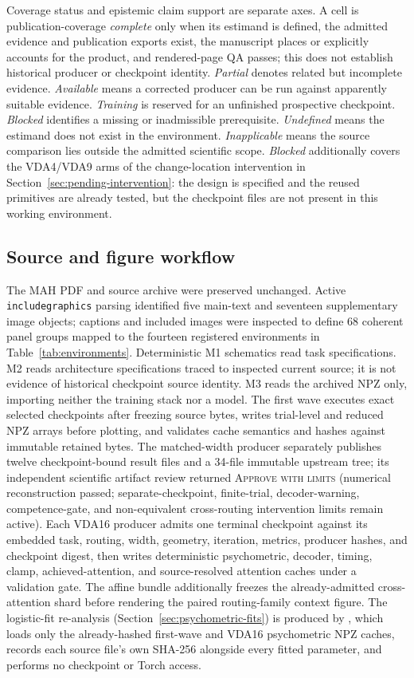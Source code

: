 \documentclass[11pt,a4paper]{article}
\begin{document}
Coverage status and epistemic claim support are separate axes. A cell is publication-coverage \emph{complete} only when its estimand is defined, the admitted evidence and publication exports exist, the manuscript places or explicitly accounts for the product, and rendered-page QA passes; this does not establish historical producer or checkpoint identity. \emph{Partial} denotes related but incomplete evidence. \emph{Available} means a corrected producer can be run against apparently suitable evidence. \emph{Training} is reserved for an unfinished prospective checkpoint. \emph{Blocked} identifies a missing or inadmissible prerequisite. \emph{Undefined} means the estimand does not exist in the environment. \emph{Inapplicable} means the source comparison lies outside the admitted scientific scope. \emph{Blocked} additionally covers the VDA4/VDA9 arms of the change-location intervention in Section~\ref{sec:pending-intervention}: the design is specified and the reused primitives are already tested, but the checkpoint files are not present in this working environment.

\subsection{Source and figure workflow}\label{sec:source-workflow}
The MAH PDF and source archive were preserved unchanged. Active \verb|includegraphics| parsing identified five main-text and seventeen supplementary image objects; captions and included images were inspected to define 68 coherent panel groups mapped to the fourteen registered environments in Table~\ref{tab:environments}. Deterministic M1 schematics read task specifications. M2 reads architecture specifications traced to inspected current source; it is not evidence of historical checkpoint source identity. M3 reads the archived NPZ only, importing neither the training stack nor a model. The first wave executes exact selected checkpoints after freezing source bytes, writes trial-level and reduced NPZ arrays before plotting, and validates cache semantics and hashes against immutable retained bytes. The matched-width producer separately publishes twelve checkpoint-bound result files and a 34-file immutable upstream tree; its independent scientific artifact review returned \textsc{Approve with limits} (numerical reconstruction passed; separate-checkpoint, finite-trial, decoder-warning, competence-gate, and non-equivalent cross-routing intervention limits remain active). Each VDA16 producer admits one terminal checkpoint against its embedded task, routing, width, geometry, iteration, metrics, producer hashes, and checkpoint digest, then writes deterministic psychometric, decoder, timing, clamp, achieved-attention, and source-resolved attention caches under a validation gate. The affine bundle additionally freezes the already-admitted cross-attention shard before rendering the paired routing-family context figure. The logistic-fit re-analysis (Section~\ref{sec:psychometric-fits}) is produced by , which loads only the already-hashed first-wave and VDA16 psychometric NPZ caches, records each source file's own SHA-256 alongside every fitted parameter, and performs no checkpoint or Torch access.
\end{document}
